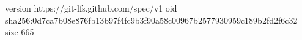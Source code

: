 version https://git-lfs.github.com/spec/v1
oid sha256:0d7ca7b08e876fb13b97f4fc9b3f90a58c00967b2577930959c189b2fd2f6c32
size 665
